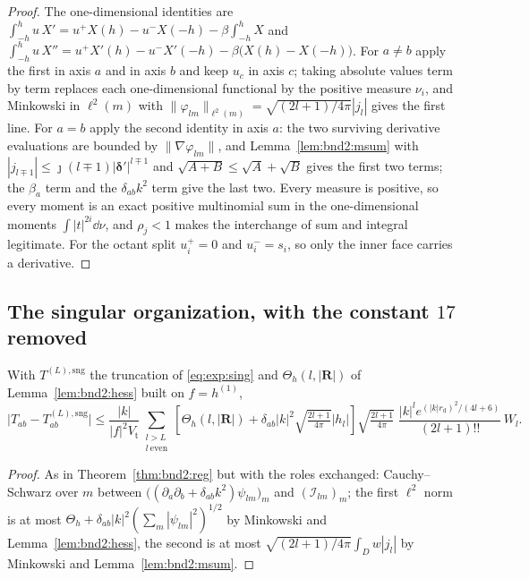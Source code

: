 \begin{proof}
The one-dimensional identities are
$\int_{-h}^{h}u\,X' = u^{+}X(h) - u^{-}X(-h) - \beta\int_{-h}^{h}X$ and
$\int_{-h}^{h}u\,X'' = u^{+}X'(h) - u^{-}X'(-h) - \beta\bigl(X(h)-X(-h)\bigr)$. For
$a \ne b$ apply the first in axis $a$ and in axis $b$ and keep $u_c$ in axis $c$; taking
absolute values term by term replaces each one-dimensional functional by the positive
measure $\nu_i$, and Minkowski in $\ell^2(m)$ with
$\|\varphi_{lm}\|_{\ell^2(m)} = \sqrt{(2l+1)/4\pi}|j_l|$ gives the first line. For $a = b$
apply the second identity in axis $a$: the two surviving derivative evaluations are
bounded by $\|\nabla\varphi_{lm}\|$, and Lemma~\ref{lem:bnd2:msum} with
$|j_{l\mp1}| \le \jmath(l\mp1)|\boldsymbol{\delta}'|^{l\mp1}$ and
$\sqrt{A+B}\le\sqrt A+\sqrt B$ gives the first two terms; the $\beta_a$ term and the
$\delta_{ab}k^2$ term give the last two. Every measure is positive, so every moment is an
exact positive multinomial sum in the one-dimensional moments
$\int|t|^{2i}\dd\nu$, and $\rho_j<1$ makes the interchange of sum and integral legitimate.
For the octant split $u_i^{+} = 0$ and $u_i^{-} = s_i$, so only the inner face carries a
derivative.
\end{proof}

\subsection{The singular organization, with the constant \texorpdfstring{$17$}{17} removed}
\label{sec:bnd2:sng}

\begin{theorem}
\label{thm:bnd2:sng}
With $T^{(L),\mathrm{sng}}$ the truncation of \eqref{eq:exp:sing} and
$\Theta_h(l,|\mathbf{R}|)$ of Lemma~\ref{lem:bnd2:hess} built on $f = h^{(1)}$,
\begin{equation}
\bigl|T_{ab}-T^{(L),\mathrm{sng}}_{ab}\bigr| \le
\frac{|k|}{|f|^{2}V_{\mathrm{t}}}\sum_{\substack{l>L\\ l\ \mathrm{even}}}
\left[\Theta_h(l,|\mathbf{R}|)+\delta_{ab}|k|^2\sqrt{\tfrac{2l+1}{4\pi}}|h_l|\right]
\sqrt{\tfrac{2l+1}{4\pi}}\;
\frac{|k|^{l}e^{(|k|r_{\mathrm{d}})^{2}/(4l+6)}}{(2l+1)!!}\,W_l .
\label{eq:bnd2:sng}
\end{equation}
\end{theorem}

\begin{proof}
As in Theorem~\ref{thm:bnd2:reg} but with the roles exchanged: Cauchy--Schwarz over $m$
between $\bigl((\partial_a\partial_b+\delta_{ab}k^2)\psi_{lm}\bigr)_m$ and
$(\mathcal{I}_{lm})_m$; the first $\ell^2$ norm is at most
$\Theta_h + \delta_{ab}|k|^2(\sum_m|\psi_{lm}|^2)^{1/2}$ by Minkowski and
Lemma~\ref{lem:bnd2:hess}, the second is at most
$\sqrt{(2l+1)/4\pi}\int_Dw|j_l|$ by Minkowski and Lemma~\ref{lem:bnd2:msum}.
\end{proof}

